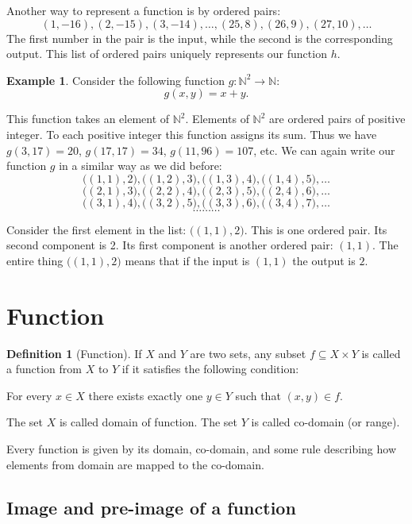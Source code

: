 \documentclass[11pt]{article}
\theoremstyle{definition}
\newtheorem{defn}[thm]{Definition}
\newtheorem{exmp}[thm]{Example}
\theoremstyle{plain}
\begin{document}
Another way to represent a function is by ordered pairs: \[ (1,-16), (2,-15), (3,-14), \dots, (25,8), (26,9), (27,10), \dots\] The first number in the pair is the input, while the second is the corresponding output. This list of ordered pairs uniquely represents our function \( h \).


\begin{exmp}
Consider the following function \( g:\mathbb N^2\to\mathbb N \): \[ g(x,y)=x+y.\]
\end{exmp}

This function takes an element of \( \mathbb N^2 \). Elements of \( \mathbb N^2 \) are ordered pairs of positive integer. To each positive integer this function assigns its sum. Thus we have \( g(3,17)=20 \), \( g(17,17)=34 \), \( g(11,96)=107 \), etc. We can again write our function \( g \) in a similar way as we did before: \[ \big((1,1),2\big), \big((1,2),3\big), \big((1,3),4\big), \big((1,4),5\big),\dots \] \[ \big((2,1),3\big), \big((2,2),4\big), \big((2,3),5\big), \big((2,4),6\big),\dots \] \[ \big((3,1),4\big), \big((3,2),5\big), \big((3,3),6\big), \big((3,4),7\big),\dots \]
\[ \dots\dots\dots\]

Consider the first element in the list: \( \big ((1,1),2\big) \). This is one ordered pair. Its second component is 2. Its first component is another ordered pair: \( (1,1) \). The entire thing \( \big ((1,1),2\big) \) means that if the input is \( (1,1) \) the output is \( 2 \).

\section{Function}

\begin{defn}[Function]
If \( X \) and \( Y \) are two sets, any subset \( f\subseteq X\times Y \) is called a function from \( X \) to \( Y \) if it satisfies the following condition:

For every \( x\in X \) there exists exactly one \( y\in Y \) such that \( (x,y)\in f \).
\end{defn}

The set \( X \) is called domain of function. The set \( Y \) is called co-domain (or range).

Every function is given by its domain, co-domain, and some rule describing how elements from domain are mapped to the co-domain.

\subsection{Image and pre-image of a function}
\end{document}
